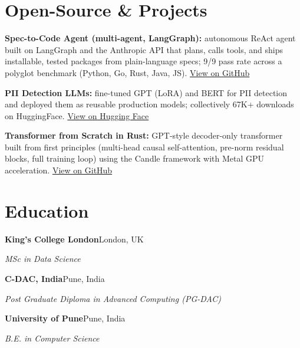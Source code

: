 \documentclass[10pt,a4paper]{article}
\begin{document}
\section{Open-Source \& Projects}
\begin{tight}
  \item \textbf{Spec-to-Code Agent (multi-agent, LangGraph):} autonomous ReAct agent built on LangGraph and the Anthropic API that plans, calls tools, and ships installable, tested packages from plain-language specs; 9/9 pass rate across a polyglot benchmark (Python, Go, Rust, Java, JS). \href{https://github.com/abhijeetscode/Spec-to-Code-Agent}{View on GitHub}
  \item \textbf{PII Detection LLMs:} fine-tuned GPT (LoRA) and BERT for PII detection and deployed them as reusable production models; collectively 67K+ downloads on HuggingFace. \href{https://huggingface.co/ab-ai/pii_model}{View on Hugging Face}
  \item \textbf{Transformer from Scratch in Rust:} GPT-style decoder-only transformer built from first principles (multi-head causal self-attention, pre-norm residual blocks, full training loop) using the Candle framework with Metal GPU acceleration. \href{https://github.com/abhijeetscode/transformer-rust}{View on GitHub}
\end{tight}

\section{Education}
{\color{company}\bfseries King's College London}\hfill {\color{muted}London, UK}\par
{\itshape MSc in Data Science}\par\vspace{2pt}
{\color{company}\bfseries C-DAC, India}\hfill {\color{muted}Pune, India}\par
{\itshape Post Graduate Diploma in Advanced Computing (PG-DAC)}\par\vspace{2pt}
{\color{company}\bfseries University of Pune}\hfill {\color{muted}Pune, India}\par
{\itshape B.E. in Computer Science}\par
\end{document}
